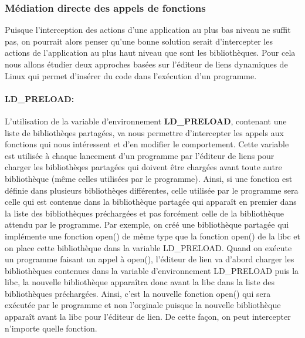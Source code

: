 \subsubsection{Médiation directe des appels de fonctions}

Puisque l'interception des actions d'une application au plus bas niveau ne
suffit pas, on pourrait alors penser qu'une bonne solution serait d'intercepter
les actions de l'application au plus haut niveau que sont les
bibliothèques. Pour cela nous allons étudier deux approches basées sur l'éditeur
de liens dynamiques de Linux qui permet d'insérer du code dans l'exécution
d'un programme.

\paragraph{LD\_PRELOAD:}

L'utilisation de la variable d'environnement
\textbf{LD\_PRELOAD}\citet{INTERCEPTIONLDPRELOAD}, contenant une liste de
bibliothèqes partagées, va nous permettre d'intercepter les appels aux fonctions
qui nous intéressent et d'en modifier le comportement. Cette variable est
utilisée à chaque lancement d'un programme par l'éditeur de liens pour charger
les bibliothèqes partagées qui doivent être chargées avant toute autre
bibliothèque (même celles utilisées par le programme). Ainsi, si une fonction
est définie dans plusieurs bibliothèqes différentes, celle utilisée par le
programme sera celle qui est contenue dans la bibliothèque partagée qui apparaît
en premier dans la liste des bibliothèques préchargées et pas forcément celle de
la bibliothèque attendu par le programme. Par exemple, on créé une bibliothèque
partagée qui implémente une fonction open() de même type que la fonction open()
de la libc et on place cette bibliothèque dans la variable LD\_PRELOAD. Quand on
exécute un programme faisant un appel à open(), l'éditeur de lien va d'abord
charger les bibliothèques contenues dans la variable d'environnement LD\_PRELOAD
puis la libc, la nouvelle bibliothèque apparaîtra donc avant la libc dans la
liste des bibliothèques préchargées. Ainsi, c'est la nouvelle fonction open()
qui sera exécutée par le programme et non l'orginale puisque la nouvelle
bibliothèque apparaît avant la libc pour l'éditeur de lien. De cette façon, on
peut intercepter n'importe quelle fonction.

